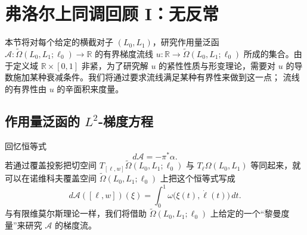 
\section{弗洛尔上同调回顾 I：无反常}
\label{sec:2-3}

本节将对每个给定的横截对子 $(L_0,L_1)$，研究作用量泛函
$\mathcal A:\widetilde\Omega(L_0,L_1;\ell_0)\to\mathbb R$ 的有界梯度流线
$u:\mathbb R\to\widetilde\Omega(L_0,L_1;\ell_0)$ 所成的集合。由于定义域
$\mathbb R\times[0,1]$ 非紧，为了研究解 $u$ 的紧性性质与形变理论，需要对
$u$ 的导数施加某种衰减条件。我们将通过要求流线满足某种有界性来做到这一点；
流线的有界性由 $u$ 的辛面积来度量。

\subsection{作用量泛函的 \texorpdfstring{$L^2$}{L2}-梯度方程}
\label{sec:2-3-1}

回忆恒等式
\[
  d\mathcal A=-\pi^*\alpha.
\]
若通过覆盖投影把切空间
$T_{[\ell,w]}\widetilde\Omega(L_0,L_1;\ell_0)$ 与
$T_\ell\Omega(L_0,L_1)$ 等同起来，就可以在诺维科夫覆盖空间
$\widetilde\Omega(L_0,L_1;\ell_0)$ 上把这个恒等式写成
\begin{equation}
  d\mathcal A([\ell,w])(\xi)
  =\int_0^1\omega\bigl(\xi(t),\dot\ell(t)\bigr)\,dt.
  \tag{2.3.1}\label{eq:2-3-1}
\end{equation}
与有限维莫尔斯理论一样，我们将借助
$\widetilde\Omega(L_0,L_1;\ell_0)$ 上给定的一个“黎曼度量”来研究
$\mathcal A$ 的梯度流。

